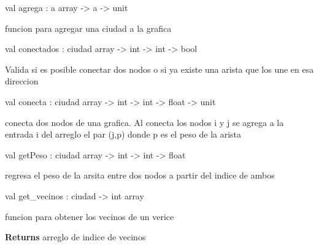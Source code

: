 \documentclass[11pt]{article}
\begin{document}
\label{val:Grafica.agrega}\begin{ocamldoccode}
val agrega : {\textquotesingle}a array -> {\textquotesingle}a -> unit
\end{ocamldoccode}
\begin{ocamldocdescription}
funcion para agregar una ciudad a la grafica


\end{ocamldocdescription}




\label{val:Grafica.conectados}\begin{ocamldoccode}
val conectados : ciudad array -> int -> int -> bool
\end{ocamldoccode}
\begin{ocamldocdescription}
Valida si es posible conectar dos nodos o si ya existe una arista que los une en esa direccion


\end{ocamldocdescription}




\label{val:Grafica.conecta}\begin{ocamldoccode}
val conecta : ciudad array -> int -> int -> float -> unit
\end{ocamldoccode}
\begin{ocamldocdescription}
conecta dos nodos de una grafica. Al conecta los nodos i y j se agrega a la entrada i del arreglo
el par (j,p) donde p es el peso de la arista


\end{ocamldocdescription}




\label{val:Grafica.getPeso}\begin{ocamldoccode}
val getPeso : ciudad array -> int -> int -> float
\end{ocamldoccode}
\begin{ocamldocdescription}
regresa el peso de la arsita entre dos nodos a partir del indice de ambos


\end{ocamldocdescription}




\label{val:Grafica.get-underscorevecinos}\begin{ocamldoccode}
val get_vecinos : ciudad -> int array
\end{ocamldoccode}
\begin{ocamldocdescription}
funcion para obtener los vecinos de un verice

{\bf Returns }arreglo de indice de vecinos


\end{ocamldocdescription}
\end{document}
